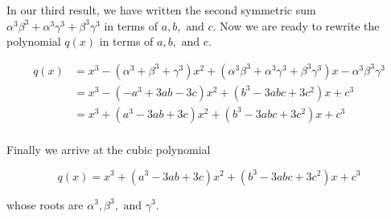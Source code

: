 In our third result, we have written the second symmetric sum $\alpha^3 \beta^3 + \alpha^3 \gamma^3 + \beta^3 \gamma^3$ in terms of $a, b, \text{ and } c$. Now we are ready to rewrite the polynomial $q(x)$ in terms of $a, b, \text{ and } c$.

\begin{align*}
q(x) &= x^3 - (\alpha^3 + \beta^3 + \gamma^3) x^2 + (\alpha^3 \beta^3 + \alpha^3 \gamma^3 + \beta^3 \gamma^3) x - \alpha^3 \beta^3 \gamma^3 \\
&= x^3 - (-a^3 + 3ab - 3c)x^2 + (b^3 - 3abc + 3c^2)x + c^3 \\
&= x^3 + (a^3 - 3ab + 3c)x^2 + (b^3 - 3abc + 3c^2)x + c^3 \\
\end{align*}

Finally we arrive at the cubic polynomial

$$ \boxed{q(x) = x^3 + (a^3 - 3ab + 3c)x^2 + (b^3 - 3abc + 3c^2)x + c^3} $$

whose roots are $\alpha^3, \beta^3, \text{ and } \gamma^3$.
